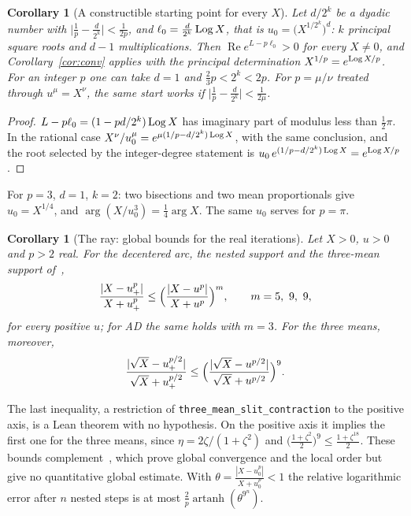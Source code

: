 \documentclass[10pt,a4paper]{article}
\theoremstyle{plain}
\newtheorem{corollary}[theorem]{Corollary}
\theoremstyle{remark}
\numberwithin{equation}{section}
\DeclareMathOperator{\re}{Re}\DeclareMathOperator{\im}{Im}
\DeclareMathOperator{\artanh}{artanh}
\newcommand{\lean}[1]{\texttt{#1}}
\begin{document}
\begin{corollary}[A constructible starting point for every $X$]\label{cor:start}
Let $d/2^{k}$ be a dyadic number with $\bigl|\frac1p-\frac d{2^{k}}\bigr|<\frac1{2p}$, and
$\ell_0=\frac d{2^{k}}\operatorname{Log} X$, that is $u_0=\bigl(X^{1/2^{k}}\bigr)^{d}$: $k$ principal square roots
and $d-1$ multiplications. Then $\re e^{L-p\ell_0}>0$ for every $X\neq0$, and
Corollary~\ref{cor:conv} applies with the principal determination $X^{1/p}=e^{\operatorname{Log} X/p}$. For an
integer $p$ one can take $d=1$ and $\frac23p<2^{k}<2p$. For $p=\mu/\nu$ treated through
$u^{\mu}=X^{\nu}$, the same start works if $\bigl|\frac1p-\frac d{2^{k}}\bigr|<\frac1{2\mu}$.
\end{corollary}

\begin{proof}
$L-p\ell_0=(1-pd/2^{k})\operatorname{Log} X$ has imaginary part of modulus less than $\frac12\pi$. In the rational
case $X^{\nu}/u_0^{\mu}=e^{\mu(1/p-d/2^{k})\operatorname{Log} X}$, with the same conclusion, and the root selected
by the integer-degree statement is $u_0\,e^{(1/p-d/2^{k})\operatorname{Log} X}=e^{\operatorname{Log} X/p}$.
\end{proof}

For $p=3$, $d=1$, $k=2$: two bisections and two mean proportionals give $u_0=X^{1/4}$, and
$\arg(X/u_0^{3})=\frac14\arg X$. The same $u_0$ serves for $p=\pi$.

\begin{corollary}[The ray: global bounds for the real iterations]\label{cor:real}
Let $X>0$, $u>0$ and $p>2$ real. For the decentered arc, the nested support and the three-mean
support of~\cite{v28,v29},
\[
 \frac{|X-u_+^{p}|}{X+u_+^{p}}\le\Bigl(\frac{|X-u^{p}|}{X+u^{p}}\Bigr)^{m},\qquad m=5,\ 9,\ 9,
\]
for \emph{every} positive $u$; for AD the same holds with $m=3$. For the three means, moreover,
\[
 \frac{|\sqrt X-u_+^{p/2}|}{\sqrt X+u_+^{p/2}}\le
 \Bigl(\frac{|\sqrt X-u^{p/2}|}{\sqrt X+u^{p/2}}\Bigr)^{9}.
\]
\end{corollary}

The last inequality, a restriction of \lean{three\_mean\_slit\_contraction} to the positive axis,
is a Lean theorem with no hypothesis. On the positive axis it implies the first one for the three
means, since $\eta=2\zeta/(1+\zeta^{2})$ and $\bigl(\frac{1+\zeta^{2}}2\bigr)^{9}\le\frac{1+\zeta^{18}}2$. These bounds complement~\cite{v28,v29}, which prove global
convergence and the local order but give no quantitative global estimate. With $\theta=\frac{|X-u_0^{p}|}{X+u_0^{p}}<1$ the relative logarithmic
error after $n$ nested steps is at most $\frac2p\artanh(\theta^{9^{n}})$.
\end{document}
